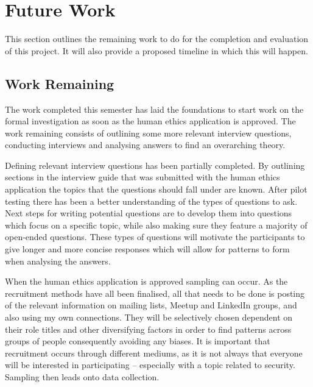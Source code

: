 \chapter{Future Work}\label{C:future}

\par This section outlines the remaining work to do for the completion and evaluation of this project. It will also provide a proposed timeline in which this will happen. 

\section{Work Remaining}

\par The work completed this semester has laid the foundations to start work on the formal investigation as soon as the human ethics application is approved. The work remaining consists of outlining some more relevant interview questions, conducting interviews and analysing answers to find an overarching theory.
\newline
\par Defining relevant interview questions has been partially completed. By outlining sections in the interview guide that was submitted with the human ethics application the topics that the questions should fall under are known. After pilot testing there has been a better understanding of the types of questions to ask. Next steps for writing potential questions are to develop them into questions which focus on a specific topic, while also making sure they feature a majority of open-ended questions. These types of questions will motivate the participants to give longer and more concise responses which will allow for patterns to form when analysing the answers.
\newline
\par When the human ethics application is approved sampling can occur. As the recruitment methods have all been finalised, all that needs to be done is posting of the relevant information on mailing lists, Meetup and LinkedIn groups, and also using my own connections. They will be selectively chosen dependent on their role titles and other diversifying factors in order to find patterns across groups of people consequently avoiding any biases. It is important that recruitment occurs through different mediums, as it is not always that everyone will be interested in participating – especially with a topic related to security.  Sampling then leads onto data collection.
\newline
